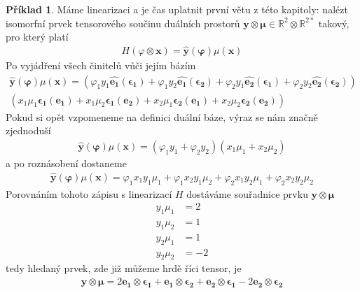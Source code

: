 \documentclass[a5paper,12pt]{amsbook}
\theoremstyle{definition}
\newtheorem{example}{Příklad}[chapter]
\newcommand{\myvec}[1]{\mathbf{#1}}
\newcommand{\myspace}[1]{\mathbb{#1}}
\newcommand{\mycocovec}[1]{\myvec{\widehat{#1}}}
\begin{document}
\begin{example}
Máme linearizaci a je čas uplatnit první větu z této kapitoly: nalézt isomorfní prvek tensorového
součinu duálních prostorů $\myvec{y}\otimes\myvec{\mu}\in \myspace{R}^2\otimes\myspace{R}^{2*}$
takový, pro který platí
\begin{equation*}
\begin{split}
H(\myspace{\varphi}\otimes\myvec{x}) = \mycocovec{y}(\myvec{\varphi})\myspace{\mu}(\myvec{x})
\end{split}
\end{equation*}
Po vyjádření všech činitelů vůči jejím bázím
\begin{equation*}
\begin{split}
\mycocovec{y}(\myvec{\varphi})\myspace{\mu}(\myvec{x})
  = (\varphi_1 y_1 \mycocovec{e_1}(\myvec{\epsilon_1})
  + \varphi_1 y_2 \mycocovec{e_1}(\myvec{\epsilon_2})
  + \varphi_2 y_1 \mycocovec{e_2}(\myvec{\epsilon_1})
  + \varphi_2 y_2 \mycocovec{e_2}(\myvec{\epsilon_2})) \\
    (x_1 \mu_1 \myvec{\epsilon_1}(\myvec{e_1})
  + x_1 \mu_2 \myvec{\epsilon_1}(\myvec{e_2})
  + x_2 \mu_1 \myvec{\epsilon_2}(\myvec{e_1})
  + x_2 \mu_2 \myvec{\epsilon_2}(\myvec{e_2}))
\end{split}
\end{equation*}
Pokud si opět vzpomeneme na definici duální báze, výraz se nám značně zjednoduší
\begin{equation*}
\begin{split}
\mycocovec{y}(\myvec{\varphi})\myspace{\mu}(\myvec{x})
  = (\varphi_1 y_1 + \varphi_2 y_2)(x_1 \mu_1 + x_2 \mu_2)
\end{split}
\end{equation*}
a po roznásobení dostaneme
\begin{equation*}
\begin{split}
\mycocovec{y}(\myvec{\varphi})\myspace{\mu}(\myvec{x})
= \varphi_1 x_1 y_1 \mu_1 + \varphi_1 x_2 y_1 \mu_2 + \varphi_2 x_1 y_2 \mu_1 + \varphi_2 x_2 y_2 \mu_2
\end{split}
\end{equation*}
Porovnáním tohoto zápisu s linearizací $H$ dostáváme souřadnice prvku $\myvec{y}\otimes\myvec{\mu}$
\begin{equation*}
\begin{split}
y_1 \mu_1 &= 2 \\
y_1 \mu_2 &= 1 \\
y_2 \mu_1 &= 1 \\
y_2 \mu_2 &= -2
\end{split}
\end{equation*}
tedy hledaný prvek, zde již můžeme hrdě říci tensor, je
\begin{equation*}
\begin{split}
\myvec{y}\otimes\myvec{\mu} 
  = 2\myvec{e_1}\otimes\myvec{\epsilon_1}
  + \myvec{e_1}\otimes\myvec{\epsilon_2}
  + \myvec{e_2}\otimes\myvec{\epsilon_1}
  - 2\myvec{e_2}\otimes\myvec{\epsilon_2}
\end{split}
\end{equation*}
\end{example}
\end{document}
